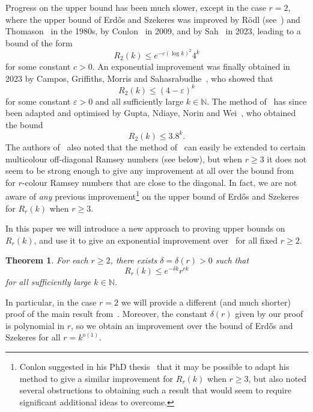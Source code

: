 \documentclass[12pt,reqno]{amsart}
\newtheorem{theorem}{Theorem}[section]
\theoremstyle{definition}
\theoremstyle{remark}
\newcommand\N{\mathbb{N}}
\newcommand\eps{\varepsilon}
\renewcommand{\le}{\leqslant}
\renewcommand{\ge}{\geqslant}
\def\eps{\varepsilon}
\def\N{\mathbb{N}}
\begin{document}
Progress on the upper bound has been much slower, except in the case $r = 2$, where the upper bound of Erd\H{o}s and Szekeres was improved by R\"odl (see~\cite{GR}) and Thomason~\cite{T88} in the 1980s, by Conlon~\cite{C09} in 2009, and by Sah~\cite{S23} in 2023, leading to a bound of the form
$$R_2(k) \le e^{- c(\log k)^2} 4^k$$
for some constant $c > 0$. An exponential improvement was finally obtained in 2023 by Campos, Griffiths, Morris and Sahasrabudhe~\cite{CGMS}, who showed that
$$R_2(k) \le (4 - \eps)^k$$ 
for some constant $\eps > 0$ and all sufficiently large $k \in \N$. The method of~\cite{CGMS} has since been adapted and optimised by Gupta, Ndiaye, Norin and Wei~\cite{GNNW}, who obtained the bound
$$R_2(k) \le 3.8^k.$$ 
The authors of~\cite{GNNW} also noted that the method of~\cite{CGMS} can easily be extended to certain multicolour off-diagonal Ramsey numbers (see below), but when $r \ge 3$ it does not seem to be strong enough to give any improvement at all over the %
bound from~\cite{ESz35} for $r$-colour Ramsey numbers that are close to the diagonal. In fact, we are not aware of \emph{any} previous improvement\footnote{Conlon suggested in his PhD thesis~\cite[page~46]{CPhD} that it may be possible to adapt his method to give a similar improvement for $R_r(k)$ when $r \ge 3$, but also noted several obstructions to obtaining such a result that would seem to require significant additional ideas to overcome.} %
on the upper bound of Erd\H{o}s and Szekeres for %
$R_r(k)$ when $r \ge 3$. 

In this paper we will introduce a new approach to proving upper bounds on $R_r(k)$, and use it to give an exponential improvement over~\cite{ESz35} for all fixed $r \ge 2$. 
 
\begin{theorem}\label{thm:Ramsey:multicolour}
For each $r \ge 2$, there exists $\delta = \delta(r) > 0$ such that 
$$R_r(k) \le e^{-\delta k} r^{rk}$$ 
for all sufficiently large $k \in \N$. 
\end{theorem}

In particular, in the case $r = 2$ we will provide a different (and much shorter) proof of the main result from~\cite{CGMS}. Moreover, the constant $\delta(r)$ given by our proof is polynomial in $r$, so we obtain an improvement over the bound of Erd\H{o}s and Szekeres for all $r = k^{o(1)}$. 
\end{document}
